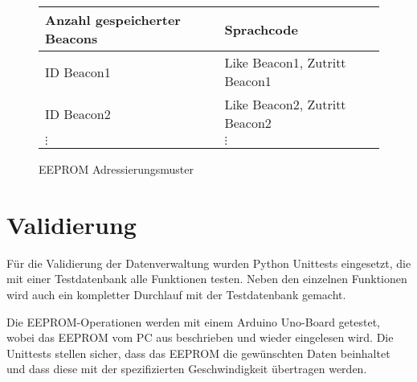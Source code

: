 \begin{figure}
	\begin{tabular}{l|l}
		Anzahl gespeicherter Beacons & Sprachcode    \\ \hline
		ID Beacon1 & Like Beacon1, Zutritt Beacon1   \\ \hline
		ID Beacon2 & Like Beacon2, Zutritt Beacon2   \\ \hline
		\(\vdots\) & \(\vdots\) 
	\end{tabular}
	\caption{EEPROM Adressierungsmuster}
	\label{eeprom_memory_pattern}
\end{figure}

\section{Validierung}
Für die Validierung der Datenverwaltung wurden Python Unittests eingesetzt, die mit einer Testdatenbank alle Funktionen testen.
Neben den einzelnen Funktionen wird auch ein kompletter Durchlauf mit der Testdatenbank gemacht.

Die EEPROM-Operationen werden mit einem Arduino Uno-Board getestet, wobei das EEPROM vom PC aus beschrieben und wieder eingelesen wird.
Die Unittests stellen sicher, dass das EEPROM die gewünschten Daten beinhaltet und dass diese mit der spezifizierten Geschwindigkeit übertragen werden.


